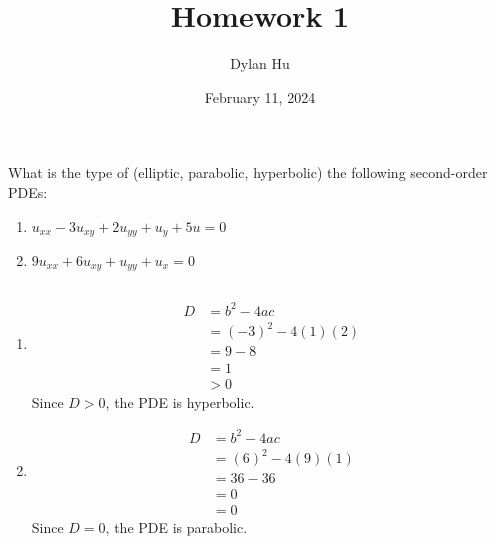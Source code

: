 \documentclass[plain]{pset}
\title{Homework 1}
\author{Dylan Hu}
\date{February 11, 2024}
\begin{document}
\begin{multicols}{2}
    \raggedcolumns{}
    \maketitle
    \columnbreak{}
    \tableofcontents
\end{multicols}

\setlength{\parskip}{1em}

\pagebreak

\begin{problem}
What is the type of (elliptic, parabolic, hyperbolic) the following second-order PDEs:
\begin{enumerate}[label = (\alph*)]
    \item \(u_{xx} - 3u_{xy} + 2u_{yy} + u_y + 5u = 0\)
    \item \(9u_{xx}+ 6u_{xy} + u_{yy} + u_x = 0\)
\end{enumerate}
\end{problem}
\begin{solution}
    \[\]
    \vspace*{-4em}
    \begin{enumerate}[label = (\alph*)]
        \item
              \begin{align*}
                  D & = b^2 - 4ac        \\
                    & = (-3)^2 - 4(1)(2) \\
                    & = 9 - 8            \\
                    & = 1                \\
                    & > 0
              \end{align*}
              Since \(D > 0\), the PDE is hyperbolic.
        \item \begin{align*}
                  D & = b^2 - 4ac       \\
                    & = (6)^2 - 4(9)(1) \\
                    & = 36 - 36         \\
                    & = 0               \\
                    & = 0
              \end{align*}
              Since \(D = 0\), the PDE is parabolic.
    \end{enumerate}
\end{solution}

\pagebreak
\end{document}
